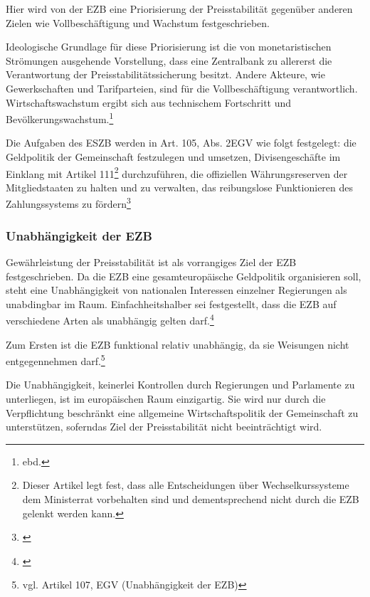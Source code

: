 \documentclass[
        onecolumn,
        a4paper,
        abstracton,
        parskip=half
        ,final
        ]{scrartcl}
\begin{document}
Hier wird von der EZB eine Priorisierung der Preisstabilit{\"a}t gegen{\"u}ber anderen Zielen wie Vollbesch{\"a}ftigung und Wachstum festgeschrieben.

Ideologische Grundlage f{\"u}r diese Priorisierung ist die von monetaristischen Str{\"o}mungen ausgehende Vorstellung, dass eine Zentralbank zu allererst die Verantwortung der Preisstabilit{\"a}tssicherung besitzt. Andere Akteure, wie Gewerkschaften und Tarifparteien, sind f{\"u}r die Vollbesch{\"a}ftigung verantwortlich. Wirtschaftswachstum ergibt sich aus technischem Fortschritt und Bev{\"o}lkerungswachstum.\footnote[50]{ebd.}


Die Aufgaben des \ac{ESZB} werden in Art. 105, Abs. 2\ac{EGV} wie folgt festgelegt: die Geldpolitik der Gemeinschaft festzulegen und umsetzen, Divisengesch{\"a}fte im Einklang mit Artikel 111\footnote[1999]{Dieser Artikel legt fest, dass alle Entscheidungen {\"u}ber Wechselkurssysteme dem Ministerrat vorbehalten sind und dementsprechend nicht durch die EZB gelenkt werden kann.} durchzuf{\"u}hren, die offiziellen W{\"a}hrungsreserven der Mitgliedstaaten zu halten und zu verwalten, das reibungslose Funktionieren des Zahlungssystems zu f{\"o}rdern\footnote[50]{\citep*[vgl.][S.555]{Basseler2010}}

\subsubsection{Unabh{\"a}ngigkeit der EZB}  %

Gew{\"a}hrleistung der Preisstabilit{\"a}t ist als vorrangiges Ziel der EZB festgeschrieben. Da die EZB eine gesamteurop{\"a}ische Geldpolitik organisieren soll, steht eine Unabh{\"a}ngigkeit von nationalen Interessen einzelner Regierungen als unabdingbar im Raum. Einfachheitshalber sei festgestellt, dass die EZB auf verschiedene Arten als unabh{\"a}ngig gelten darf.\footnote[51]{\citep*[vgl.][S.555-557]{Basseler2010}}

Zum Ersten ist die EZB funktional relativ unabh{\"a}ngig, da sie Weisungen nicht entgegennehmen darf.\footnote[34]{vgl. Artikel 107, \ac{EGV} (Unabh{\"a}ngigkeit der EZB)}

Die Unabh{\"a}ngigkeit, keinerlei Kontrollen durch Regierungen und Parlamente zu unterliegen, ist im europ{\"a}ischen Raum einzigartig. Sie wird nur durch die Verpflichtung beschr{\"a}nkt eine allgemeine Wirtschaftspolitik der Gemeinschaft zu unterst{\"u}tzen, soferndas Ziel der Preisstabilit{\"a}t nicht beeintr{\"a}chtigt wird.
\end{document}
